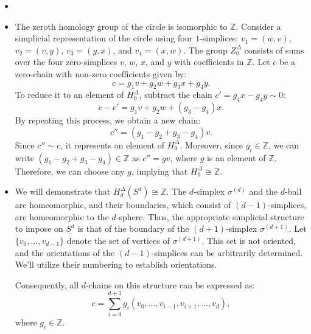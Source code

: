 \begin{example}
    \begin{itemize}
        \item[]
        \item The zeroth homology group of the circle is isomorphic to $\mathbb{Z}$. Consider a simplicial representation of the circle using four $1$-simplices: $v_1 = (w, v)$, $v_2 = (v, y)$, $v_3 = (y, x)$, and $v_4 = (x, w)$. The group $Z^\Delta_0$ consists of sums over the four zero-simplices $v$, $w$, $x$, and $y$ with coefficients in $\mathbb{Z}$. Let $c$ be a zero-chain with non-zero coefficients given by:
        \[
            c = g_1 v + g_2 w + g_3 x + g_4 y.
        \]
        To reduce it to an element of $H^\Delta_0$, subtract the chain $c' = g_4 x - g_4 y \sim 0$:
        \[
            c - c' = g_1 v + g_2 w + (g_3 - g_4) x.
        \]
        By repeating this process, we obtain a new chain:
        \[
            c'' = (g_1 - g_2 + g_3 - g_4) v.
        \]
        Since $c'' \sim c$, it represents an element of $H^\Delta_0$. Moreover, since $g_i \in \mathbb{Z}$, we can write $(g_1 - g_2 + g_3 - g_4) \in \mathbb{Z}$ as $c'' = g v$, where $g$ is an element of $\mathbb{Z}$. Therefore, we can choose any $g$, implying that $H^\Delta_0 \cong \mathbb{Z}$.

        \item We will demonstrate that $H^\Delta_d(S^d) \cong \mathbb{Z}$. The $d$-simplex $\sigma^{(d)}$ and the $d$-ball are homeomorphic, and their boundaries, which consist of $(d-1)$-simplices, are homeomorphic to the $d$-sphere. Thus, the appropriate simplicial structure to impose on $S^d$ is that of the boundary of the $(d+1)$-simplex $\sigma^{(d+1)}$. Let $\{v_0, \ldots, v_{d-1}\}$ denote the set of vertices of $\sigma^{(d+1)}$. This set is not oriented, and the orientations of the $(d-1)$-simplices can be arbitrarily determined. We'll utilize their numbering to establish orientations.

        Consequently, all $d$-chains on this structure can be expressed as:
         \begin{equation}
            \label{chain}
            c = \sum_{i=0}^{d+1} g_i (v_0, \ldots, v_{i-1}, v_{i+1}, \ldots, v_d),
        \end{equation}
        where $g_i \in \mathbb{Z}$.


\end{itemize}
\end{example}
